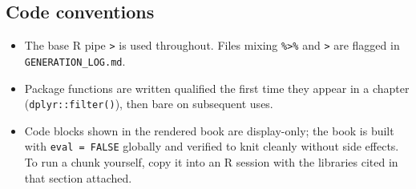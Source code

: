 \documentclass[
]{article}
\providecommand{\tightlist}{%
  \setlength{\itemsep}{0pt}\setlength{\parskip}{0pt}}
\begin{document}
\subsection*{Code conventions}\label{code-conventions}

\begin{itemize}
\tightlist
\item
  The base R pipe \texttt{\textbar{}\textgreater{}} is used throughout.
  Files mixing \texttt{\%\textgreater{}\%} and
  \texttt{\textbar{}\textgreater{}} are flagged in
  \texttt{GENERATION\_LOG.md}.
\item
  Package functions are written qualified the first time they appear in
  a chapter (\texttt{dplyr::filter()}), then bare on subsequent uses.
\item
  Code blocks shown in the rendered book are display-only; the book is
  built with \texttt{eval\ =\ FALSE} globally and verified to knit
  cleanly without side effects. To run a chunk yourself, copy it into an
  R session with the libraries cited in that section attached.
\end{itemize}
\end{document}
